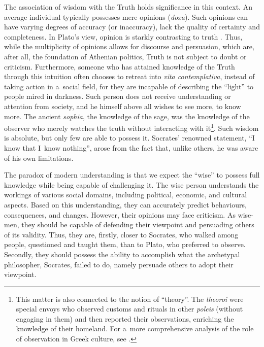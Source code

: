 The association of wisdom with the Truth holds significance in this context. An average individual typically possesses mere opinions (\textit{doxa}). Such opinions can have varying degrees of accuracy (or inaccuracy), lack the quality of certainty and completeness. In Plato's view, opinion is starkly contrasting to truth 
\parencite[][pp.7–8]{arendt_promise_2005}. %
 Thus, while the multiplicity of opinions allows for discourse and persuasion, which are, after all, the foundation of Athenian politics, Truth is not subject to doubt or criticism. Furthermore, someone who has attained knowledge of the Truth through this intuition often chooses to retreat into \textit{vita contemplativa}, instead of taking action in a~social field, for they are incapable of describing the ``light'' to people mired in darkness. Such person does not receive understanding or attention from society, and he himself above all wishes to see more, to know more. The ancient \textit{sophia}, the knowledge of the sage, was the knowledge of the observer who merely watches the truth without interacting with it\footnote{This matter is also connected to the notion of ``theory''. The \textit{theoroi} were special envoys who observed customs and rituals in other \textit{poleis} (without engaging in them) and then reported their observations, enriching the knowledge of their homeland. For a~more comprehensive analysis of the role of observation in Greek culture, see 
\parencite[][]{ceglarska_od_2022}.%
}. Such wisdom is absolute, but only few are able to possess it. Socrates' renowned statement, ``I know that I~know nothing'', arose from the fact that, unlike others, he was aware of his own limitations.



The paradox of modern understanding is that we expect the ``wise'' to possess full knowledge while being capable of challenging it. The wise person understands the workings of various social domains, including political, economic, and cultural aspects. Based on this understanding, they can accurately predict behaviours, consequences, and changes. However, their opinions may face criticism. As wise-men, they should be capable of defending their viewpoint and persuading others of its validity. Thus, they are, firstly, closer to Socrates, who walked among people, questioned and taught them, than to Plato, who preferred to observe. Secondly, they should possess the ability to accomplish what the archetypal philosopher, Socrates, failed to do, namely persuade others to adopt their viewpoint.



